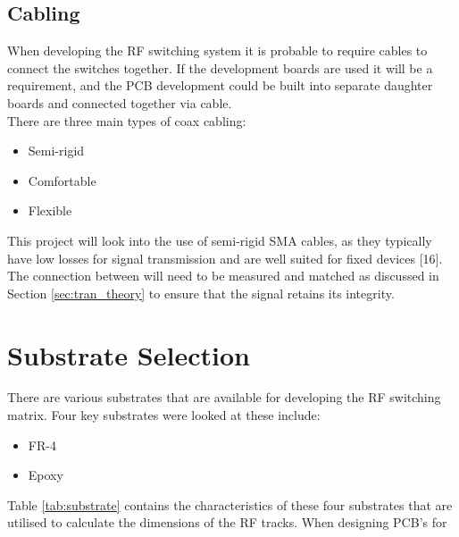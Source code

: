 \documentclass[12pt,openany,a4paper]{book}
\begin{document}
\subsection{Cabling}
When developing the RF switching system it is probable to require cables to connect the switches together. If the development boards are used it will be a requirement, and the PCB development could be built into separate daughter boards and connected together via cable. \\
There are three main types of coax cabling:
\begin{itemize}
	\setlength\itemsep{-0.5em}
	\item Semi-rigid
	\item Comfortable
	\item Flexible
\end{itemize}
This project will look into the use of semi-rigid SMA cables, as they typically have low losses for signal transmission and are well suited for fixed devices [16]. The connection between will need to be measured and matched as discussed in Section \ref{sec:tran_theory} to ensure that the signal retains its integrity.




\section{Substrate Selection}
There are various substrates that are available for developing the RF switching matrix. Four key substrates were looked at these include:
\begin{itemize} [noitemsep,topsep=0pt]
  \item FR-4
  \item Epoxy
\end{itemize}
Table \ref{tab:substrate} contains the characteristics of these four substrates that are utilised to calculate the dimensions of the RF tracks. 
When designing PCB's for 



\end{document}
